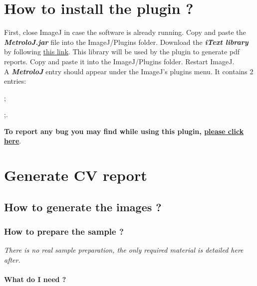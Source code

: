 \documentclass[a4paper, 11pt]{report}%
\makeatletter
\newcommand{\mailbug}{\begin{center}\textbf{To report any bug you may find while using this plugin, \href{mailto:fabrice.cordelieres@gmail.com,cedric.matthews@ibdml.univ-mrs.fr ?subject=Bug\%20found\%20in\%20MetroloJ&body=\%0ABug\%20description:\%0A\%0AHow\%20did\%20it\%20happen:\%0A\%0ACopy/Paste\%20the\%20content\%20of\%20the\%20log\%20window\%0A\%0AVersion\%20of\%20ImageJ:\%0A\%0AVersion\%20of\%20Java:}{please click here}}.\end{center}}
\makeatother
\begin{document}
\chapter{How to install the plugin ?}

First, close ImageJ in case the software is already running. Copy and paste the \textit{\textbf{MetroloJ.jar}} file into the ImageJ/Plugins folder. Download the \textit{\textbf{iText library}} by following \href{http://prdownloads.sourceforge.net/itext/iText-2.1.5.jar}{this link}. This library will be used by the plugin to generate pdf reports. Copy and paste it into the ImageJ/Plugins folder. Restart ImageJ.\\
A \textit{\textbf{MetroloJ}} entry should appear under the ImageJ's plugins menu. It contains 2 entries:

\begin{itemize*} %
	\item {};
	\item {};.
\end{itemize*}

\mailbug

\chapter{Generate CV report}
\label{chap:gcvr}

\section{How to generate the images ?}
\label{sec:gcvr-what}

\subsection{How to prepare the sample ?}
\label{sec:gcvr-proto}

\textit{There is no real sample preparation, the only required material is detailed here after.}

\subsubsection{What do I need ?}
\label{sec:gcvr-proto-what}
\end{document}
